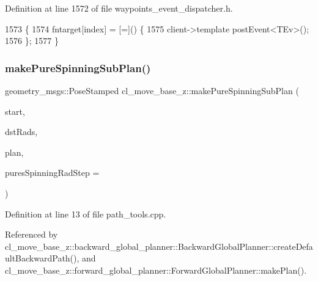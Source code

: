 Definition at line 1572 of file waypoints\+\_\+event\+\_\+dispatcher.\+h.


\begin{DoxyCode}
1573 \{
1574     fntarget[index] = [=]() \{
1575         client->template postEvent<TEv>();
1576     \};
1577 \}
\end{DoxyCode}
\mbox{\label{namespacecl__move__base__z_ac774e138510eb7b5e0015be1f7709e19}} 
\subsubsection{\texorpdfstring{make\+Pure\+Spinning\+Sub\+Plan()}{makePureSpinningSubPlan()}}
{\footnotesize\ttfamily geometry\+\_\+msgs\+::\+Pose\+Stamped cl\+\_\+move\+\_\+base\+\_\+z\+::make\+Pure\+Spinning\+Sub\+Plan (\begin{DoxyParamCaption}\item[{const geometry\+\_\+msgs\+::\+Pose\+Stamped \&}]{start,  }\item[{double}]{dst\+Rads,  }\item[{std\+::vector$<$ geometry\+\_\+msgs\+::\+Pose\+Stamped $>$ \&}]{plan,  }\item[{double}]{pures\+Spinning\+Rad\+Step = {} }\end{DoxyParamCaption})}



Definition at line 13 of file path\+\_\+tools.\+cpp.



Referenced by cl\+\_\+move\+\_\+base\+\_\+z\+::backward\+\_\+global\+\_\+planner\+::\+Backward\+Global\+Planner\+::create\+Default\+Backward\+Path(), and cl\+\_\+move\+\_\+base\+\_\+z\+::forward\+\_\+global\+\_\+planner\+::\+Forward\+Global\+Planner\+::make\+Plan().



